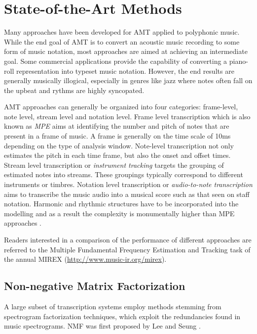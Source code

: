 \section{State-of-the-Art Methods}

Many approaches have been developed for \ac{AMT} applied to polyphonic music. While
the end goal of \ac{AMT} is to convert an acoustic music recording to some form of
music notation, most approaches are aimed at achieving an intermediate goal.
Some commercial applications provide the capability of converting a piano-roll
representation into typeset music notation. However, the end results are
generally musically illogical, especially in genres like jazz where notes often
fall on the upbeat and rythms are highly syncopated.

\ac{AMT} approaches can generally be organized into four categories: frame-level,
note level, stream level and notation level. Frame level transcription which is
also known as \emph{\ac{MPE}} aims at identifying the number and
pitch of notes that are present in a frame of music. A frame is generally on the
time scale of 10ms depending on the type of analysis window. Note-level
transcription not only estimates the pitch in each time frame, but also the onset
and offset times. Stream level transcription or \emph{instrument tracking}
targets the grouping of estimated notes into streams. These groupings typically
correspond to different instruments or timbres. Notation level transcription or
\emph{audio-to-note transcription} aims to transcribe the music audio into a
musical score such as that seen on staff notation. Harmonic and rhythmic
structures have to be incorporated into the modelling and as a result the
complexity is monumentally higher than \ac{MPE} approaches \cite{MIR-recent-dev:Schedl}.

Readers interested in a comparison of the performance of different approaches
are referred to the Multiple Fundamental Frequency Estimation and Tracking task
of the annual \ac{MIREX}
(\url{http://www.music-ir.org/mirex}).


\subsection{Non-negative Matrix Factorization}

A large subset of transcription systems employ methods stemming from spectrogram
factorization techniques, which exploit the redundancies found in music
spectrograms. \ac{NMF} was first proposed by Lee and Seung \cite{nmf1999:Seung}.

